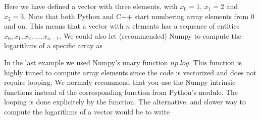 \documentclass[letterpaper,10pt,english]{sphinxmanual}
\begin{document}
Here we have defined a vector with three elements, with \(x_0=1\), \(x_1=2\) and \(x_2=3\). Note that both Python and C++
start numbering array elements from \(0\) and on. This means that a vector with \(n\) elements has a sequence of entities \(x_0, x_1, x_2, \dots, x_{n-1}\). We could also let (recommended) Numpy to compute the logarithms of a specific array as

\begin{sphinxVerbatim}[commandchars=\\\{\}]
   
  \PYG{p}{[}  \PYG{p}{]}
\end{sphinxVerbatim}

\begin{sphinxVerbatim}[commandchars=\\\{\}]
[1.38629436 1.94591015 2.07944154]
\end{sphinxVerbatim}

In the last example we used Numpy’s unary function \(np.log\). This function is
highly tuned to compute array elements since the code is vectorized
and does not require looping. We normaly recommend that you use the
Numpy intrinsic functions instead of the corresponding  function
from Python’s  module. The looping is done explicitely by the
 function. The alternative, and slower way to compute the
logarithms of a vector would be to write

\begin{sphinxVerbatim}[commandchars=\\\{\}]
   
   
  \PYG{p}{[}  \PYG{p}{]}
    
    \PYG{p}{[}\PYG{p}{]}  \PYG{p}{[}\PYG{p}{]}
\end{sphinxVerbatim}
\end{document}
